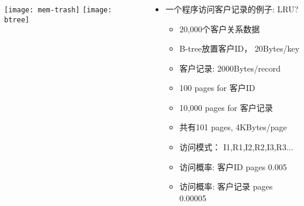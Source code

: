 \begin{frame}[plain]
	\frametitle{ }
	\begin{columns}
		\begin{column}{.5\textwidth}
			\centering
			\texttt{[image: mem-trash]}
			\texttt{[image: btree]}
		\end{column}
		
		\begin{column}{.5\textwidth}
			
			\begin{itemize}
				\item 一个程序访问客户记录的例子: LRU?
				\begin{itemize}
					
					\item 20,000个客户关系数据
					\item B-tree放置客户ID， 20Bytes/key
					\item 客户记录: 2000Bytes/record
					\item 100 pages for 客户ID
					\item 10,000 pages for 客户记录
					\item 共有101 pages, 4KBytes/page
					\item 访问模式： I1,R1,I2,R2,I3,R3...
					\item 访问概率: 客户ID pages 0.005
					\item 访问概率: 客户记录 pages 0.00005
				\end{itemize}
			\end{itemize}


		\end{column}
		
		
	\end{columns}
\end{frame}




